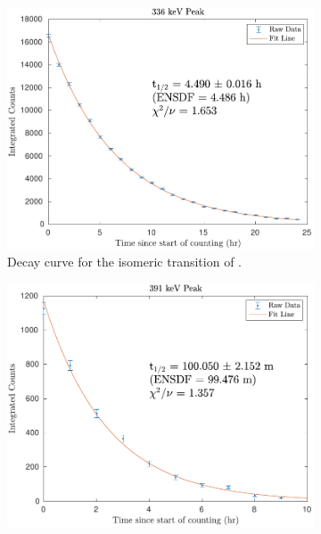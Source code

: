 \documentclass[5p]{elsarticle}
\begin{document}
\begin{figure}
    \centering
    \begin{subfigure}[t]{0.49\textwidth}
        \centering
        \includegraphics[scale=0.6]{./figures/336keV_curve_new.pdf}
        \caption{ Decay curve for the isomeric transition of .}
        \label{fig:decay_curve_336}
    \end{subfigure}%
     \begin{subfigure}[t]{0.49\textwidth}
        \centering
        \includegraphics[scale=0.6]{./figures/391keV_curve_new.pdf}

\end{subfigure}
\end{figure}
\end{document}
